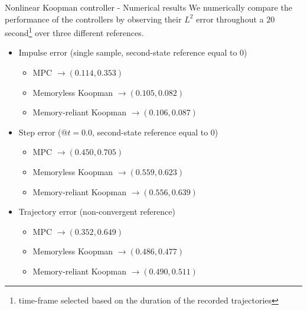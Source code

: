\documentclass{beamer}
\begin{document}
\begin{frame}{Nonlinear Koopman controller - Numerical results}
    We numerically compare the performance of the controllers by observing their $L^2$ error throughout a $20$ second\footnote{time-frame selected based on the duration of the recorded trajectories} over three different references.

    \begin{itemize}
        \item Impulse error (single sample, second-state reference equal to 0)
            \begin{itemize}
                \item MPC $\rightarrow \left(0.114,0.353\right)$
                \item Memoryless Koopman $\rightarrow \left(0.105,0.082\right)$
                \item Memory-reliant Koopman $\rightarrow \left(0.106,0.087\right)$
            \end{itemize}
        \item Step error ($@t=0.0$, second-state reference equal to 0)
            \begin{itemize}
                \item MPC $\rightarrow \left(0.450,0.705\right)$
                \item Memoryless Koopman $\rightarrow \left(0.559,0.623\right)$
                \item Memory-reliant Koopman $\rightarrow \left(0.556,0.639\right)$
            \end{itemize}
        \item Trajectory error (non-convergent reference)
            \begin{itemize}
                \item MPC $\rightarrow \left(0.352,0.649\right)$
                \item Memoryless Koopman $\rightarrow \left(0.486,0.477\right)$
                \item Memory-reliant Koopman $\rightarrow \left(0.490,0.511\right)$
            \end{itemize}
    \end{itemize}
\end{frame}
\end{document}
